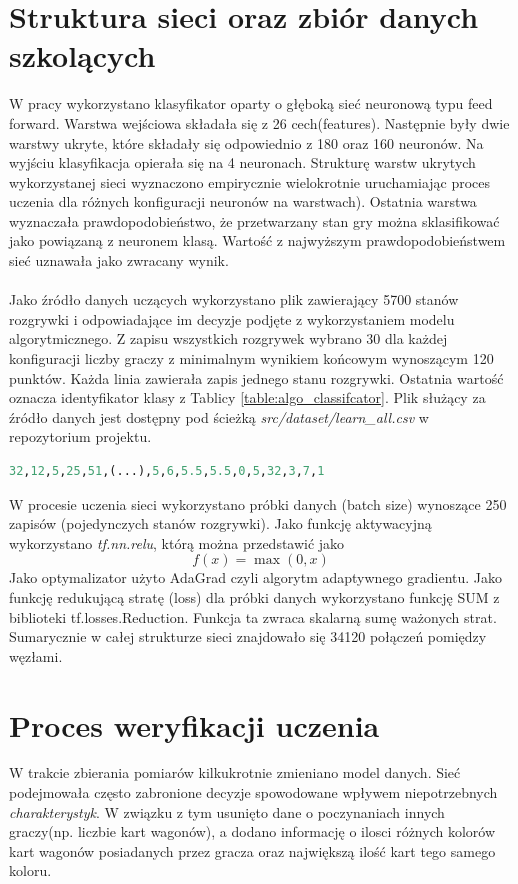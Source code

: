 \documentclass[12pt, oneside]{report}
\begin{document}
	\section{Struktura sieci oraz zbiór danych szkolących}
	\label{ch:learning_data}
	W pracy wykorzystano klasyfikator oparty o głęboką sieć neuronową typu feed forward. Warstwa wejściowa składała się z 26 cech(features). Następnie były dwie warstwy ukryte, które składały się odpowiednio z 180 oraz 160 neuronów. Na wyjściu klasyfikacja opierała się na 4 neuronach. Strukturę warstw ukrytych wykorzystanej sieci wyznaczono empirycznie wielokrotnie uruchamiając proces uczenia dla różnych konfiguracji neuronów na warstwach). Ostatnia warstwa wyznaczała prawdopodobieństwo, że przetwarzany stan gry można sklasifikować jako powiązaną z neuronem klasą. Wartość z najwyższym prawdopodobieństwem sieć uznawała jako zwracany wynik.
	\\ \\ 
	Jako źródło danych uczących wykorzystano plik zawierający 5700 stanów rozgrywki i odpowiadające im decyzje podjęte z wykorzystaniem modelu algorytmicznego. Z zapisu wszystkich rozgrywek wybrano 30 dla każdej konfiguracji liczby graczy z minimalnym wynikiem końcowym wynoszącym 120 punktów. Każda linia zawierała zapis jednego stanu rozgrywki. Ostatnia wartość oznacza identyfikator klasy z Tablicy \ref{table:algo_classifcator}. Plik służący za źródło danych jest dostępny pod ścieżką \textit{src/dataset/learn\_all.csv} w repozytorium projektu. 
	\begin{lstlisting}[frame=single, language=Python, caption=Pojedynczy format danych uczacych]
	32,12,5,25,51,(...),5,6,5.5,5.5,0,5,32,3,7,1
	\end{lstlisting}
	
	W procesie uczenia sieci wykorzystano próbki danych (batch size) wynoszące 250 zapisów (pojedynczych stanów rozgrywki). Jako funkcję aktywacyjną wykorzystano \textit{tf.nn.relu}, którą można przedstawić jako 
	\begin{equation}
	f(x) = \max (0,x)
	\label{eq:relu}
	\end{equation}
	Jako optymalizator użyto AdaGrad czyli algorytm adaptywnego gradientu. Jako funkcję redukującą stratę (loss) dla próbki danych wykorzystano funkcję SUM z biblioteki tf.losses.Reduction. Funkcja ta zwraca skalarną sumę ważonych strat. Sumarycznie w całej strukturze sieci znajdowało się 34120 połączeń pomiędzy węzłami.
	\section{Proces weryfikacji uczenia}
	W trakcie zbierania pomiarów kilkukrotnie zmieniano model danych. Sieć podejmowała często zabronione decyzje spowodowane wpływem niepotrzebnych \textit{charakterystyk}. W związku z tym usunięto dane o poczynaniach innych graczy(np. liczbie kart wagonów), a dodano informację o ilosci różnych kolorów kart wagonów posiadanych przez gracza oraz największą ilość kart tego samego koloru.
\end{document}
